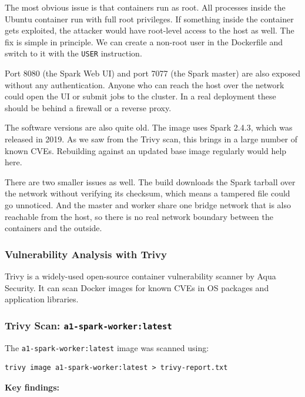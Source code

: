 \documentclass[11pt,a4paper]{article}
\begin{document}
The most obvious issue is that containers run as root. All processes inside
the Ubuntu container run with full root privileges. If something inside the
container gets exploited, the attacker would have root-level access to the
host as well. The fix is simple in principle. We can create a non-root user
in the Dockerfile and switch to it with the \texttt{USER} instruction.

Port 8080 (the Spark Web UI) and port 7077 (the Spark master) are also exposed
without any authentication. Anyone who can reach the host over the network
could open the UI or submit jobs to the cluster. In a real deployment
these should be behind a firewall or a reverse proxy.

The software versions are also quite old. The image uses Spark 2.4.3, which
was released in 2019. As we saw from the Trivy scan, this brings in a large
number of known CVEs. Rebuilding against an updated base image regularly
would help here.

There are two smaller issues as well. The build downloads the Spark tarball
over the network without verifying its checksum, which means a tampered file
could go unnoticed. And the master and worker share one bridge network that
is also reachable from the host, so there is no real network boundary between
the containers and the outside.

\subsubsection*{Vulnerability Analysis with Trivy}

Trivy is a widely-used
open-source container vulnerability scanner by Aqua Security. It can scan
Docker images for known CVEs in OS packages and application libraries.

\subsubsection*{Trivy Scan: \texttt{a1-spark-worker:latest}}

The \texttt{a1-spark-worker:latest} image was scanned using:

\begin{lstlisting}[style=shell]
trivy image a1-spark-worker:latest > trivy-report.txt
\end{lstlisting}

\textbf{Key findings:}
\end{document}
